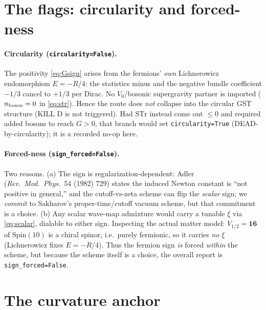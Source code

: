 \documentclass[11pt]{article}
\newcommand{\STr}{\mathrm{STr}}
\begin{document}
\section{The flags: circularity and forced-ness}\label{sec:flags}

\paragraph{Circularity (\texttt{circularity=False}).} The positivity \eqref{eq:Gsign}
arises from the fermions' \emph{own} Lichnerowicz endomorphism $E=-R/4$: the statistics
minus and the negative bundle coefficient $-1/3$ cancel to $+1/3$ per Dirac. No
$V_0$/bosonic supergravity partner is imported ($n_{\rm boson}=0$ in \eqref{eq:str}).
Hence the route does \emph{not} collapse into the circular GST structure (KILL D is not
triggered). Had $\STr$ instead come out $\le 0$ and required added bosons to reach
$G>0$, that branch would set \texttt{circularity=True} (DEAD-by-circularity); it is a
recorded no-op here.

\paragraph{Forced-ness (\texttt{sign\_forced=False}).} Two reasons. (a) The sign is
regularization-dependent: Adler (\emph{Rev.\ Mod.\ Phys.}\ 54 (1982) 729) states the
induced Newton constant is ``not positive in general,'' and the cutoff-vs-zeta scheme
can flip the \emph{scalar} sign; we \emph{commit} to Sakharov's proper-time/cutoff
vacuum scheme, but that commitment is a choice. (b) Any scalar wave-map admixture would
carry a tunable $\xi$ via \eqref{eq:scalar}, dialable to either sign. Inspecting the
actual matter model: $V_{1/2}=\mathbf{16}$ of $\mathrm{Spin}(10)$ is a chiral spinor,
i.e.\ purely fermionic, so it carries \emph{no} $\xi$ (Lichnerowicz fixes $E=-R/4$).
Thus the fermion sign \emph{is} forced \emph{within} the scheme, but because the scheme
itself is a choice, the overall report is \texttt{sign\_forced=False}.

\section{The curvature anchor}\label{sec:anchor}
\end{document}
